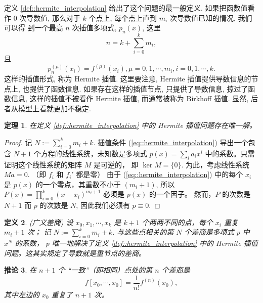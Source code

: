 \documentclass[a4paper]{ctexart}
\newtheorem{theorem}{定理}
\newtheorem{definition}[theorem]{定义} %
\newtheorem{corollary}[theorem]{推论}
\numberwithin{theorem}{section}
\numberwithin{equation}{section}
\numberwithin{figure}{section}
\numberwithin{remark}{section}
\begin{document}
定义 \ref{def::hermite_interpolation} 给出了这个问题的最一般定义. 如果把函数值看作 $0$ 次导数值,
那么对于 $k$ 个点上, 每个点上直到 $m_i$ 次导数值已知的情况, 我们可以得
到一个最高 $n$ 次插值多项式, $p_n(x)$, 这里
$$
n = k + \sum_{i = 0}^k m_i,
$$
且
$$
p_n^{(\mu)}(x_i) = f^{(\mu)}(x_i), \mu = 0, 1, \cdots, m_i, i = 0, 1, \cdots, k.
$$
这样的插值形式, 称为 Hermite 插值. 这里要注意, Hermite 插值提供导数信息的节点上, 
也提供了函数信息. 如果存在这样的插值节点, 只提供了导数信息, 掠过了函数信息, 
这样的插值不被看作 Hermite 插值, 而通常被称为 Birkhoff 插值. 显然, 后者从模型上看就更加不稳定.

\begin{theorem}
    \label{thm::hermite_existence_uniqueness}
在定义 \ref{def::hermite_interpolation} 中的 Hermite 插值问题存在唯一解。
\end{theorem}

\begin{proof}
记 $N := \sum_{i=0}^k m_i + k$. 
插值条件 (\ref{eq::hermite_interpolation}) 导出一个包含 $N + 1$ 个方程的线性系统，未知数是多项式 
$p(x) = \sum_{i} a_i x^i$ 中的系数。只需证明这个线性系统的矩阵 $M$ 是可逆的，
即 $\ker M = \{0\}$. 为此，考虑线性系统 $M a = 0$. （即 $f_i$ 和 $f_i'$ 都是零）
由于 (\ref{eq::hermite_interpolation}) 中的每个 
$x_i$ 是 $p(x)$ 的一个零点，其重数不小于 $(m_i + 1)$, 
所以 $P(x) = \prod_{i=0}^k (x - x_i)^{m_i+1}$ 必须是 $p(x)$ 的一个因子。
然而，$P$ 的次数是 $N + 1$ 而 $p$ 的次数是 $N$, 因此我们必须有 $p \equiv 0$.
\end{proof}

\begin{definition}(广义差商) 
    \label{def::generalized_divided_difference}    
设 $x_0 , x_1 , \cdots , x_k$ 
是 $k + 1$ 个两两不同的点，每个 $x_i$ 重复 $m_i + 1$ 次；
记 $N := \sum_{i=0}^k m_i + k$. 
与这些点相关的第 $N$ 个差商是多项式 $p$ 中 $x^N$ 的系数，
$p$ 唯一地解决了定义 \ref{def::hermite_interpolation} 中的 Hermite 插值问题。这其实规定了导数就是重节点的差商。
\end{definition}

\begin{corollary}
    \label{cor::hermite_divided_difference}
在 $n + 1$ 个 ``一致''（即相同）点处的第 $n$ 
个差商是
\begin{equation}
    \label{eq::hermite_divided_difference}
f [x_0 , \cdots , x_0] = \frac{1}{n!} f^{(n)} (x_0),
\end{equation}
其中左边的 $x_0$ 重复了 $n + 1$ 次。
\end{corollary}
\end{document}

